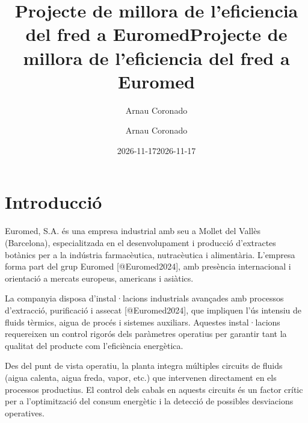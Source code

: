 \documentclass[
  paper=a4,
  oneside  ,captions=tableheading
]{scrartcl}
\title{Projecte de millora de l'eficiencia del fred a Euromed}
\author{Arnau Coronado}
\date{2026-11-17}
\title{Projecte de millora de l'eficiencia del fred a Euromed}
\author{Arnau Coronado}
\date{2026-11-17}
\renewcommand*\contentsname{Taula de continguts}
\newcommand\contentsname{Taula de continguts}
\begin{document}
\begin{titlepage}
\newcommand{\colorRule}[3][black]{\textcolor[HTML]{#1}{\rule{#2}{#3}}}
\end{titlepage}
\restoregeometry
{}




\renewcommand*\contentsname{Taula de continguts}
{
\hypersetup{linkcolor=}
\setcounter{tocdepth}{3}
\tableofcontents
\newpage
}
\section{Introducció}\label{introducciuxf3}

Euromed, S.A. és una empresa industrial amb seu a Mollet del Vallès
(Barcelona), especialitzada en el desenvolupament i producció
d'extractes botànics per a la indústria farmacèutica, nutracèutica i
alimentària. L'empresa forma part del grup Euromed {[}@Euromed2024{]},
amb presència internacional i orientació a mercats europeus, americans i
asiàtics.

La companyia disposa d'instal·lacions industrials avançades amb
processos d'extracció, purificació i assecat {[}@Euromed2024{]}, que
impliquen l'ús intensiu de fluids tèrmics, aigua de procés i sistemes
auxiliars. Aquestes instal·lacions requereixen un control rigorós dels
paràmetres operatius per garantir tant la qualitat del producte com
l'eficiència energètica.

Des del punt de vista operatiu, la planta integra múltiples circuits de
fluids (aigua calenta, aigua freda, vapor, etc.) que intervenen
directament en els processos productius. El control dels cabals en
aquests circuits és un factor crític per a l'optimització del consum
energètic i la detecció de possibles desviacions operatives.
\end{document}
